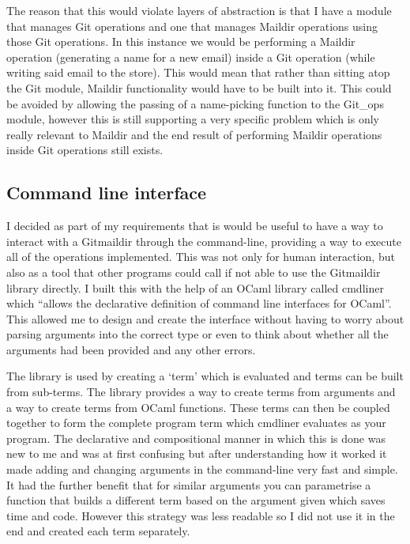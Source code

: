 The reason that this would violate layers of abstraction is that I have a module that manages Git operations and one that manages Maildir operations using those Git operations. In this instance we would be performing a Maildir operation (generating a name for a new email) inside a Git operation (while writing said email to the store). This would mean that rather than sitting atop the Git module, Maildir functionality would have to be built into it. This could be avoided by allowing the passing of a name-picking function to the Git\_ops module, however this is still supporting a very specific problem which is only really relevant to Maildir and the end result of performing Maildir operations inside Git operations still exists.

\subsection{Command line interface}

I decided as part of my requirements that is would be useful to have a way to interact with a Gitmaildir through the command-line, providing a way to execute all of the operations implemented. This was not only for human interaction, but also as a tool that other programs could call if not able to use the Gitmaildir library directly. I built this with the help of an OCaml library called cmdliner which ``allows the declarative definition of command line interfaces for OCaml''\cite{code_cmdliner}. This allowed me to design and create the interface without having to worry about parsing arguments into the correct type or even to think about whether all the arguments had been provided and any other errors.

The library is used by creating a `term' which is evaluated and terms can be built from sub-terms. The library provides a way to create terms from arguments and a way to create terms from OCaml functions. These terms can then be coupled together to form the complete program term which cmdliner evaluates as your program. The declarative and compositional manner in which this is done was new to me and was at first confusing but after understanding how it worked it made adding and changing arguments in the command-line very fast and simple. It had the further benefit that for similar arguments you can parametrise a function that builds a different term based on the argument given which saves time and code. However this strategy was less readable so I did not use it in the end and created each term separately.

